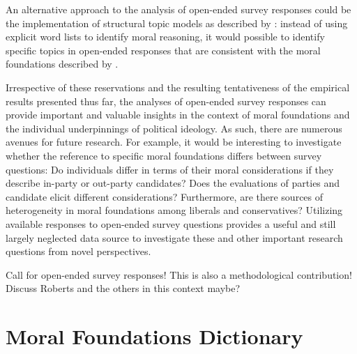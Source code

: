 \documentclass[12pt]{paper}
\begin{document}
An alternative approach to the analysis of open-ended survey responses could be the implementation of structural topic models as described by \citet{roberts2014structural}: instead of using explicit word lists to identify moral reasoning, it would possible to identify specific topics in open-ended responses that are consistent with the moral foundations described by \citet{haidt2008moral} \citep[see also][]{lin2008joint}.

Irrespective of these reservations and the resulting tentativeness of the empirical results presented thus far, the analyses of open-ended survey responses can provide important and valuable insights in the context of moral foundations and the individual underpinnings of political ideology. As such, there are numerous avenues for future research. For example, it would be interesting to investigate whether the reference to specific moral foundations differs between survey questions: Do individuals differ in terms of their moral considerations if they describe in-party or out-party candidates? Does the evaluations of parties and candidate elicit different considerations? Furthermore, are there sources of heterogeneity in moral foundations among liberals and conservatives? Utilizing available responses to open-ended survey questions provides a useful and still largely neglected data source to investigate these and other important research questions from novel perspectives.

Call for open-ended survey responses! This is also a methodological contribution! Discuss Roberts and the others in this context maybe?



\clearpage\flushleft\footnotesize\singlespacing
\appendices
\section{Moral Foundations Dictionary}
\renewcommand\thefigure{\thesection.\arabic{figure}}
\renewcommand\thetable{\thesection.\arabic{table}}
\setcounter{figure}{0}
\setcounter{table}{0}
\end{document}
